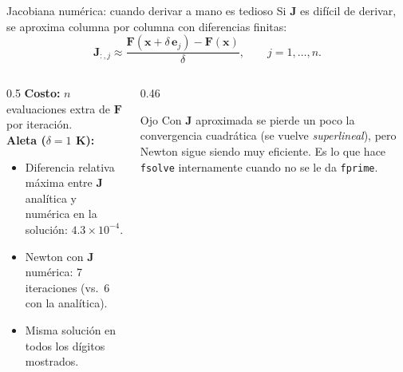 \documentclass[aspectratio=169,11pt]{beamer}
\newcommand{\vect}[1]{\mathbf{#1}}
\newcommand{\Jac}{\mathbf{J}}
\begin{document}
\begin{frame}{Jacobiana numérica: cuando derivar a mano es tedioso}
  Si $\Jac$ es difícil de derivar, se aproxima columna por columna con \alert{diferencias finitas}:
  \[
    \Jac_{:,j}\approx\frac{\vect F(\vect x+\delta\,\vect e_j)-\vect F(\vect x)}{\delta},\qquad j=1,\dots,n.
  \]
  \begin{columns}[T]
    \begin{column}{0.5\textwidth}
      \textbf{Costo:} $n$ evaluaciones extra de $\vect F$ por iteración.\\[1ex]
      \textbf{Aleta ($\delta=1$ K):}
      \begin{itemize}
        \item Diferencia relativa máxima entre $\Jac$ analítica y numérica en la solución: $4.3\times10^{-4}$.
        \item Newton con $\Jac$ numérica: 7 iteraciones (vs.\ 6 con la analítica).
        \item Misma solución en todos los dígitos mostrados.
      \end{itemize}
    \end{column}
    \begin{column}{0.46\textwidth}
      \begin{alertblock}{Ojo}
        Con $\Jac$ aproximada se pierde un poco la convergencia cuadrática (se vuelve \emph{superlineal}), pero Newton sigue siendo muy eficiente. Es lo que hace \texttt{fsolve} internamente cuando no se le da \texttt{fprime}.
      \end{alertblock}
    \end{column}
  \end{columns}
\end{frame}
\end{document}
